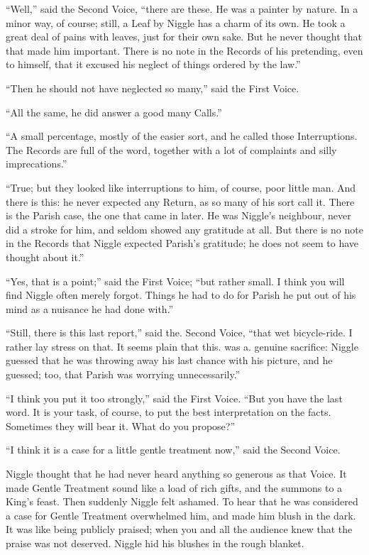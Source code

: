 \documentclass[english]{scrartcl}
\begin{document}
“Well,” said the Second Voice, “there are these. He was a painter by nature. In a minor way, of course; still, a Leaf by Niggle has a charm of its own. He took a great deal of pains with leaves, just for their own sake. But he never thought that that made him important. There is no note in the Records of his pretending, even to himself, that it excused his neglect of things ordered by the law.”

“Then he should not have neglected so many,” said the First Voice.

“All the same, he did answer a good many Calls.”

“A small percentage, mostly of the easier sort, and he called those Interruptions. The Records are full of the word, together with a lot of complaints and silly imprecations.”

“True; but they looked like interruptions to him, of course, poor little man. And there is this: he never expected any Return, as so many of his sort call it. There is the Parish case, the one that came in later. He was Niggle’s neighbour, never did a stroke for him, and seldom showed any gratitude at all. But there is no note in the Records that Niggle expected Parish’s gratitude; he does not seem to have thought about it.”

“Yes, that is a point;” said the First Voice; “but rather small. I think you will find Niggle often merely forgot. Things he had to do for Parish he put out of his mind as a nuisance he had done with.”

“Still, there is this last report,” said the. Second Voice, “that wet bicycle-ride. I rather lay stress on that. It seems plain that this. was a. genuine sacrifice: Niggle guessed that he was throwing away his last chance with his picture, and he guessed; too, that Parish was worrying unnecessarily.”

“I think you put it too strongly,” said the First Voice. “But you have the last word. It is your task, of course, to put the best interpretation on the facts. Sometimes they will bear it. What do you propose?”

“I think it is a case for a little gentle treatment now,” said the Second Voice.

Niggle thought that he had never heard anything so generous as that Voice. It made Gentle Treatment sound like a load of rich gifts, and the summons to a King’s feast. Then suddenly Niggle felt ashamed. To hear that he was considered a case for Gentle Treatment overwhelmed him, and made him blush in the dark. It was like being publicly praised; when you and all the audience knew that the praise was not deserved. Niggle hid his blushes in the rough blanket.
\end{document}

